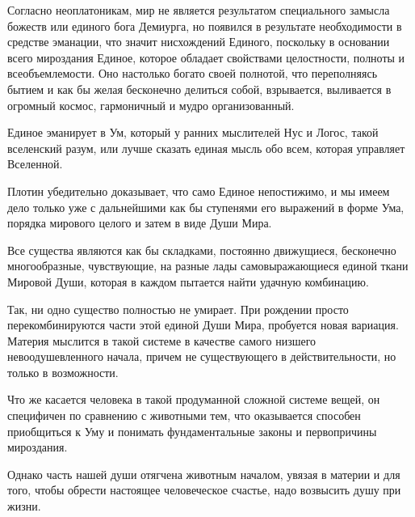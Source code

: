 
Согласно неоплатоникам, мир не является результатом специального замысла божеств или единого бога Демиурга, но появился в результате необходимости в средстве эманации, что значит нисхождений Единого, поскольку в основании всего мироздания Единое, которое обладает свойствами целостности, полноты и всеобъемлемости. Оно настолько богато своей полнотой, что переполняясь бытием и как бы желая бесконечно делиться собой, взрывается, выливается в огромный космос, гармоничный и мудро организованный. 

Единое эманирует в Ум, который у ранних мыслителей Нус и Логос, такой вселенский разум, или лучше сказать единая мысль обо всем, которая управляет Вселенной. 

Плотин убедительно доказывает, что само Единое непостижимо, и мы имеем дело только уже с дальнейшими как бы ступенями его выражений в форме Ума, порядка мирового целого и затем в виде Души Мира. 

Все существа являются как бы складками, постоянно движущиеся, бесконечно многообразные, чувствующие, на разные лады самовыражающиеся единой ткани Мировой Души, которая в каждом пытается найти удачную комбинацию. 

Так, ни одно существо полностью не умирает. При рождении просто перекомбинируются части этой единой Души Мира, пробуется новая вариация. Материя мыслится в такой системе в качестве самого низшего невоодушевленного начала, причем не существующего в действительности, но только в возможности. 


Что же касается человека в такой продуманной сложной системе вещей, он специфичен по сравнению с животными тем, что оказывается способен приобщиться к Уму и понимать фундаментальные законы и первопричины мироздания.

Однако часть нашей души отягчена животным началом, увязая в материи и для того, чтобы обрести настоящее человеческое счастье, надо возвысить душу при жизни.

